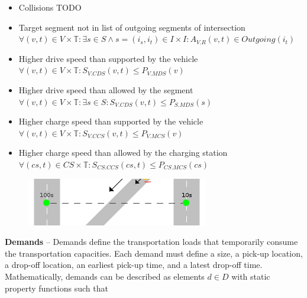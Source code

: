 \documentclass[graybox]{svmult}
\begin{document}
\begin{itemize}
	\item Collisions TODO
	\item Target segment not in list of outgoing segments of intersection $\forall (v,t) \in V \times \mathbb{T}: \exists s \in S \wedge s = (i_s, i_t) \in I \times I: A_{V.R}(v, t) \in Outgoing(i_t)$
	
	\item Higher drive speed than supported by the vehicle $\forall (v,t) \in V \times \mathbb{T}: S_{V.CDS}(v,t) \leq P_{V.MDS}(v)$
	\item Higher drive speed than allowed by the segment $\forall (v,t) \in V \times \mathbb{T}: \exists s \in S: S_{V.CDS}(v,t) \leq P_{S.MDS}(s)$
	\item Higher charge speed than supported by the vehicle $\forall (v,t) \in V \times \mathbb{T}: S_{V.CCS}(v,t) \leq P_{V.MCS}(v)$
	\item Higher charge speed than allowed by the charging station $\forall (cs,t) \in CS \times \mathbb{T}: S_{CS.CCS}(cs,t) \leq P_{CS.MCS}(cs)$
\end{itemize}
\vspace{2mm}

\begin{figure}
	\centering
	\includegraphics[scale=0.5]{../../concepts/demand.png}
\end{figure}

\noindent
\textbf{Demands}
--
Demands define the transportation loads that temporarily consume the transportation capacities.
Each demand must define a size, a pick-up location, a drop-off location, an earliest pick-up time, and a latest drop-off time.
Mathematically, demands can be described as elements $d \in D$ with static property functions such that
\end{document}

